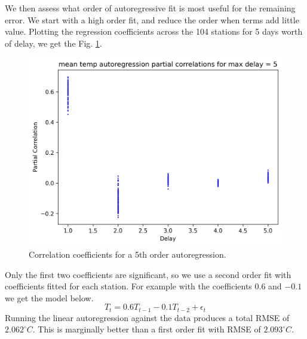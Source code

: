 \documentclass[12pt,a4paper]{article} %
\begin{document}
We then assess what order of autoregressive fit is most useful for the remaining error. We start with a high order fit, and reduce the order when terms add little value. Plotting the regression coefficients across the 104 stations for 5 days worth of delay, we get the Fig. \ref{fig:partial_corr_delay_5}.
\begin{figure}[!ht]
    \centering
    \includegraphics[width=.7\linewidth]{mean_partial_corr_by_delay_5.png}
    \caption{Correlation coefficients for a 5th order autoregression.}
    \label{fig:partial_corr_delay_5}
\end{figure}
Only the first two coefficients are significant, so we use a second order fit with coefficients fitted for each station. For example with the coefficients $0.6$ and $-0.1$ we get the model below.
\[
    T_t=0.6T_{t-1}-0.1T_{t-2}+\epsilon_t
\]
Running the linear autoregression against the data produces a total RMSE of $2.062^\circ C$. This is marginally better than a first order fit with RMSE of $2.093^\circ C$.
\end{document}
